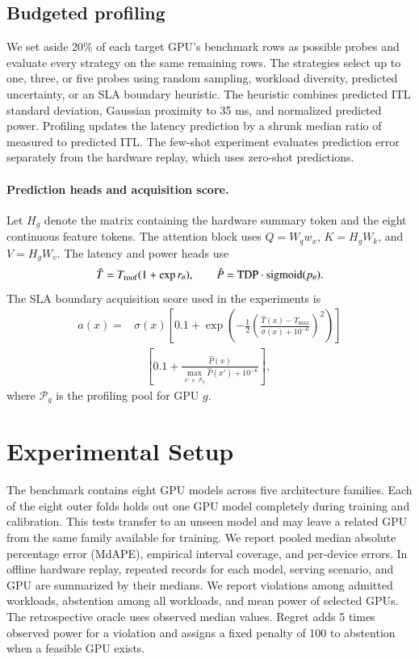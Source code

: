 \documentclass[preprint,12pt]{elsarticle}
\begin{document}
\subsection{Budgeted profiling}\label{budgeted-profiling}

We set aside 20\% of each target GPU's benchmark rows as possible probes
and evaluate every strategy on the same remaining rows. The strategies
select up to one, three, or five probes using random sampling, workload
diversity, predicted uncertainty, or an SLA boundary heuristic. The
heuristic combines predicted ITL standard deviation, Gaussian proximity
to 35 ms, and normalized predicted power. Profiling updates the latency
prediction by a shrunk median ratio of measured to predicted ITL. The
few-shot experiment evaluates prediction error separately from the
hardware replay, which uses zero-shot predictions.


\paragraph{Prediction heads and acquisition score.}
Let $H_g$ denote the matrix containing the hardware summary token and the eight continuous feature tokens.
The attention block uses $Q=W_q w_x$, $K=H_gW_k$, and $V=H_gW_v$. The latency and power heads use
\[
\hat T=T_{\rm roof}(1+\exp r_\theta),\qquad
\hat P=\mathrm{TDP}\cdot\operatorname{sigmoid}(p_\theta).
\]
The SLA boundary acquisition score used in the experiments is
\[
\begin{aligned}a(x)={}&\sigma(x)\left[0.1+\exp\left(-\frac{1}{2}
\left(\frac{\hat T(x)-T_{\max}}{\sigma(x)+10^{-6}}\right)^2\right)\right]\\
&\quad \left[0.1+\frac{\hat P(x)}{\max_{x'\,\in\,\mathcal P_g}\hat P(x')+10^{-6}}\right],
\end{aligned}
\]
where $\mathcal P_g$ is the profiling pool for GPU $g$.
\section{Experimental Setup}\label{experimental-setup}

The benchmark contains eight GPU models across five architecture
families. Each of the eight outer folds holds out one GPU model
completely during training and calibration. This tests transfer to an
unseen model and may leave a related GPU from the same family available
for training. We report pooled median absolute percentage error (MdAPE),
empirical interval coverage, and per-device errors. In offline hardware
replay, repeated records for each model, serving scenario, and GPU are
summarized by their medians. We report violations among admitted
workloads, abstention among all workloads, and mean power of selected
GPUs. The retrospective oracle uses observed median values. Regret adds
5 times observed power for a violation and assigns a fixed penalty of
100 to abstention when a feasible GPU exists.
\end{document}
